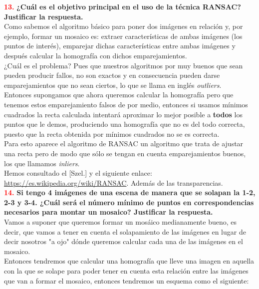 \documentclass[10pt,a4paper]{article}
\begin{document}
\textcolor{red}{\textbf{13.}} \textbf{¿Cuál es el objetivo principal en el uso de la técnica RANSAC? Justificar la respuesta.}\\

Como sabemos el algoritmo básico para poner dos imágenes en relación y, por ejemplo, formar un mosaico es:
extraer características de ambas imágenes (los puntos de interés), emparejar dichas características entre ambas imágenes y después calcular la homografía con dichos emparejamientos.\\

¿Cuál es el problema? Pues que nuestros algoritmos por muy buenos que sean pueden producir fallos, no son exactos y en consecuencia pueden darse emparejamientos que no sean ciertos, lo que se llama en inglés \textit{outliers}.\\

Entonces supongamos que ahora queremos calcular la homografía pero que tenemos estos emparejamiento falsos de por medio, entonces si usamos mínimos cuadrados la recta calculada intentará aproximar lo mejor posible a \textbf{todos} los puntos que le demos, produciendo una homografía que no es del todo correcta, puesto que la recta obtenida por mínimos cuadrados no se es correcta.\\

Para esto aparece el algoritmo de RANSAC un algoritmo que trata de ajustar una recta pero de modo que sólo se tengan en cuenta emparejamientos buenos, los que llamamos \textit{inliers}.\\

Hemos consultado el [Szel.] y el siguiente enlace: \url{https://es.wikipedia.org/wiki/RANSAC}. Además de las transparencias.\\

\textcolor{red}{\textbf{14.}} \textbf{Si tengo 4 imágenes de una escena de manera que se solapan la 1-2, 2-3 y 3-4. ¿Cuál será el número mínimo de puntos en correspondencias necesarios para montar un mosaico? Justificar la respuesta.}\\

Vamos a suponer que queremos formar un mosáico medianamente bueno, es decir, que vamos a tener en cuenta el solapamiento de las imágenes en lugar de decir nosotros "a ojo" dónde queremos calcular cada una de las imágenes en el mosaico.\\

Entonces tendremos que calcular una homografía que lleve una imagen en aquella con la que se solape para poder tener en cuenta esta relación entre las imágenes que van a formar el mosaico, entonces tendremos un esquema como el siguiente:\\
\end{document}
